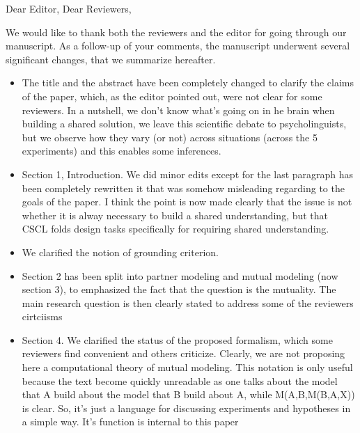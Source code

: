 \documentclass{article}
\begin{document}
Dear Editor, Dear Reviewers,

\vspace{2em}

We would like to thank both the reviewers and the editor for going through our
manuscript. As a follow-up of your comments, the manuscript underwent
several significant changes, that we summarize hereafter.

\begin{itemize}

    \item The title and the abstract have been completely changed to clarify the
        claims of the paper, which, as the editor pointed out, were not clear
        for some reviewers. In a nutshell, we don’t know what’s going on in he
        brain when building a shared solution, we leave this scientific debate
        to psycholinguists, but we observe how they vary (or not) across
        situations (across the 5 experiments)  and this enables some inferences.

    \item   Section 1, Introduction. We did minor edits except for the last
        paragraph has been completely rewritten it  that was somehow misleading
        regarding to the goals of the paper.  I think the point is now made
        clearly that the issue is not whether it is alway necessary to build a
        shared understanding, but that CSCL folds design tasks specifically for
        requiring shared understanding.

    \item We clarified the notion of grounding criterion.

    \item Section 2 has been split into partner modeling and mutual modeling (now
        section 3), to emphasized the fact that the question is the mutuality. The
        main research question is then clearly stated to address some of the
        reviewers cirtciisms

    \item Section 4. We clarified the status of the proposed formalism, which some
        reviewers find convenient and others criticize. Clearly, we are not
        proposing here a computational theory of mutual modeling. This notation is
        only useful because the text become quickly unreadable as one talks about
        the model that A build about the model that B build about A, while
        M(A,B,M(B,A,X)) is clear. So, it’s just a language for discussing
        experiments and hypotheses in a simple way. It’s function is internal to
        this paper


\end{itemize}
\end{document}
